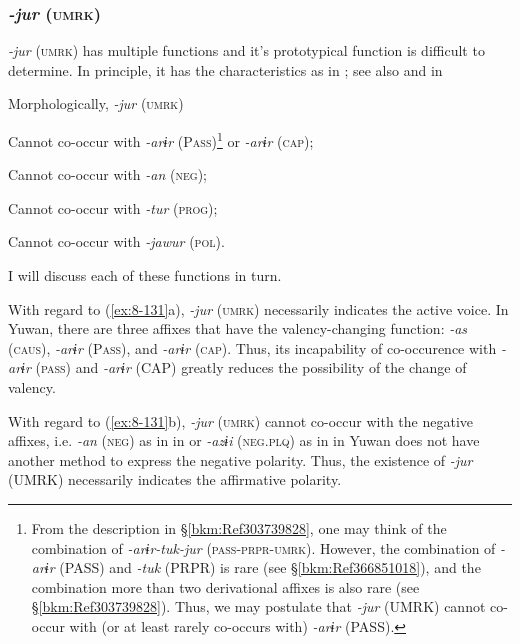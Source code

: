 \subsubsection{\textit{{}-jur} (\textsc{umrk})}

\textit{{}-jur} (\textsc{umrk}) has multiple functions and it’s prototypical function is difficult to determine. In principle, it has the characteristics as in ; see also  and  in 

\ea\label{ex:8-131}
  Morphologically, \textit{{}-jur} (\textsc{umrk})

\ea Cannot co-occur with \textit{{}-arɨr} (P\textsc{ass})\footnote{From the description in §\ref{bkm:Ref303739828}, one may think of the combination of \textit{{}-arɨr-tuk-jur} (\textsc{pass}-\textsc{prpr}-\textsc{umrk}). However, the combination of \textit{{}-arɨr} (PASS) and \textit{{}-tuk} (PRPR) is rare (see §\ref{bkm:Ref366851018}), and the combination more than two derivational affixes is also rare (see §\ref{bkm:Ref303739828}). Thus, we may postulate that \textit{{}-jur} (UMRK) cannot co-occur with (or at least rarely co-occurs with) \textit{{}-arɨr} (PASS).} or \textit{{}-arɨr} (\textsc{cap});

\ex Cannot co-occur with \textit{{}-an} (\textsc{neg});

\ex Cannot co-occur with \textit{{}-tur} (\textsc{prog});

\ex Cannot co-occur with \textit{{}-jawur} (\textsc{pol}).

I will discuss each of these functions in turn.

With regard to (\ref{ex:8-131}a), \textit{{}-jur} (\textsc{umrk}) necessarily indicates the active voice. In Yuwan, there are three affixes that have the valency-changing function: \textit{-as} (\textsc{caus}), \textit{{}-arɨr} (P\textsc{ass}), and \textit{{}-arɨr} (\textsc{cap}). Thus, its incapability of co-occurence with \textit{{}-arɨr} (\textsc{pass}) and \textit{{}-arɨr} (CAP) greatly reduces the possibility of the change of valency.

With regard to (\ref{ex:8-131}b), \textit{{}-jur} (\textsc{umrk}) cannot co-occur with the negative affixes, i.e. \textit{{}-an} (\textsc{neg}) as in  in  or \textit{{}-azɨi} (\textsc{neg}.\textsc{plq}) as in  in  Yuwan does not have another method to express the negative polarity. Thus, the existence of \textit{{}-jur} (UMRK) necessarily indicates the affirmative polarity.

